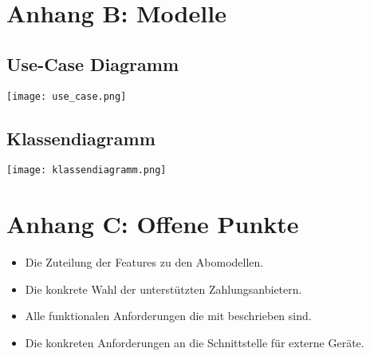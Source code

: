 \section*{Anhang B: Modelle}
\subsection{Use-Case Diagramm}
\texttt{[image: use\_case.png]}

\subsection{Klassendiagramm}
\texttt{[image: klassendiagramm.png]}

\section*{Anhang C: Offene Punkte}

\begin{itemize}
    \item Die Zuteilung der Features zu den Abomodellen.
    \item Die konkrete Wahl der unterstützten Zahlungsanbietern.
    \item Alle funktionalen Anforderungen die mit  beschrieben sind.
    \item Die konkreten Anforderungen an die Schnittstelle für externe Geräte. 
\end{itemize}

